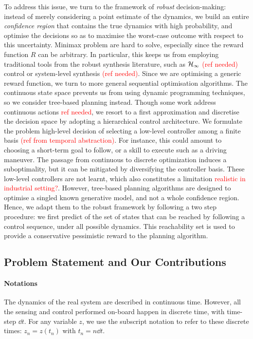 \documentclass{article}
\newcommand{\todo}[1]{\textcolor{red}{#1}}
\begin{document}
To address this issue, we turn to the framework of \emph{robust} decision-making: instead of merely considering a point estimate of the dynamics, we build an entire \emph{confidence region} that contains the true dynamics with high probability, and optimise the decisions so as to maximise the worst-case outcome with respect to this uncertainty. Minimax problem are hard to solve, especially since the reward function $R$ can be arbitrary. In particular, this keeps us from employing traditional tools from the robust synthesis literature, such as $\mathcal{H}_\infty$ \todo{(ref needed)} control or system-level synthesis \todo{(ref needed)}. Since we are optimising a generic reward function, we turn to more general sequential optimisation algorithms. The continuous state space prevents us from using dynamic programming techniques, so we consider tree-based planning instead. Though some work address continuous actions \todo{ref needed}, we resort to a first approximation and discretise the decision space by adopting a hierarchical control architecture. We  formulate the problem high-level decision of selecting a low-level controller among a finite basis \todo{(ref from temporal abstraction)}. For instance, this could amount to choosing a short-term goal to follow, or a skill to execute such as a driving maneuver. The passage from continuous to discrete optimization induces a suboptimality, but it can be mitigated by diversifying the controller basis. These low-level controllers are not learnt, which also constitutes a limitation \todo{realistic in industrial setting?}. However, tree-based planning algorithms are designed to optimise a singled known generative model, and not a whole confidence region. Hence, we adapt them to the robust framework by following a two step procedure: we first predict of the set of states that can be reached by following a control sequence, under all possible dynamics. This reachability set is used to provide a conservative pessimistic reward to the planning algorithm.


\subsection{Problem Statement and Our Contributions}

\paragraph{Notations}

The dynamics of the real system are described in continuous time. However, all the sensing and control performed on-board happen in discrete time, with time-step $\dd t$. For any variable $z$, we use the subscript notation to refer to these discrete times: $z_n = z(t_n)$ with $t_n = n\dd t$.
\end{document}
